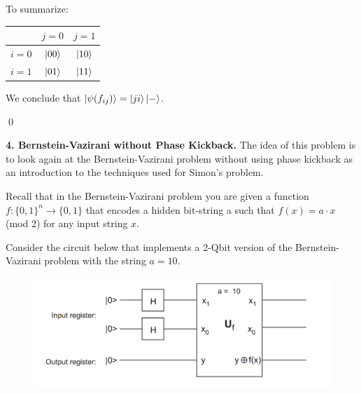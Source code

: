 \documentclass{book}
\theoremstyle{definition}
\begin{document}
\begin{enumerate}[(a)]
	To summarize:
	\begin{center}
	\begin{tabular}{|c|c|c|}
		\hline
			& $j=0$ & $j=1$ \\
		\hline
		$i=0$ & $\ket{00}$ &  $\ket{10}$\\
		\hline
		$i=1$ & $\ket{01}$ & $\ket{11}$ \\
		\hline
	\end{tabular}
	\end{center}

	We conclude that $\ket{\psi (f_{ij})} = \ket{ji}\ket{-}$.
	
\end{enumerate}







\qed



\newpage

\noindent \textbf{4. Bernstein-Vazirani without Phase Kickback.}  The idea of this problem is to look again
at the Bernstein-Vazirani problem without using phase kickback as an introduction to the
techniques used for Simon’s problem. 

Recall that in the Bernstein-Vazirani problem you are given a function $f : \{0, 1\}^n \to \{0, 1\}$ that encodes a hidden bit-string a such that $f(x) = a \cdot x$ (mod 2) for any input string $x$.

Consider the circuit below that implements a 2-Qbit version of the Bernstein-Vazirani problem
with the string $a = 10$.

\begin{figure}[!htb]
	\centering
	\includegraphics[scale=0.25]{phase4}
\end{figure}
\end{document}
